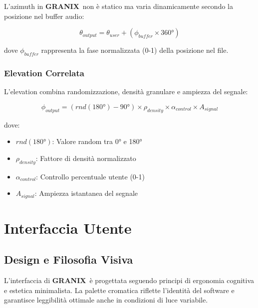 \documentclass[a4paper,11pt,openany]{book}
\newcommand{\granix}{\textbf{\textcolor{granixblue}{GRANIX}}}
\begin{document}
L'azimuth in \granix\ non è statico ma varia dinamicamente secondo la posizione nel buffer audio:

\begin{equation}
\theta_{output} = \theta_{user} + (\phi_{buffer} \times 360°)
\end{equation}

dove $\phi_{buffer}$ rappresenta la fase normalizzata (0-1) della posizione nel file.

\subsection{Elevation Correlata}

L'elevation combina randomizzazione, densità granulare e ampiezza del segnale:

\begin{equation}
\phi_{output} = (rnd(180°) - 90°) \times \rho_{density} \times \alpha_{control} \times A_{signal}
\end{equation}

dove:
\begin{itemize}
    \item $rnd(180°)$: Valore random tra 0° e 180°
    \item $\rho_{density}$: Fattore di densità normalizzato
    \item $\alpha_{control}$: Controllo percentuale utente (0-1)
    \item $A_{signal}$: Ampiezza istantanea del segnale
\end{itemize}

\chapter{Interfaccia Utente}

\section{Design e Filosofia Visiva}

L'interfaccia di \granix\ è progettata seguendo principi di ergonomia cognitiva e estetica minimalista. La palette cromatica riflette l'identità del software e garantisce leggibilità ottimale anche in condizioni di luce variabile.
\end{document}
